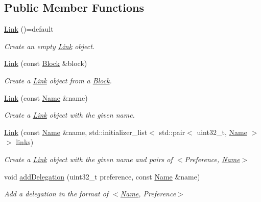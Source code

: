 \subsection*{Public Member Functions}
\begin{DoxyCompactItemize}
\item 
\hyperlink{classndn_1_1Link_a9319fdfdbe6708e6da2694a0db5062b2}{Link} ()=default
\begin{DoxyCompactList}\small\item\em Create an empty \hyperlink{classndn_1_1Link}{Link} object. \end{DoxyCompactList}\item 
\hyperlink{classndn_1_1Link_a0a49619a5844110df36006c2ae773b11}{Link} (const \hyperlink{classndn_1_1Block}{Block} \&block)
\begin{DoxyCompactList}\small\item\em Create a \hyperlink{classndn_1_1Link}{Link} object from a \hyperlink{classndn_1_1Block}{Block}. \end{DoxyCompactList}\item 
\hyperlink{classndn_1_1Link_ab0ed148484feaceef39d6537bd996c5f}{Link} (const \hyperlink{classndn_1_1Name}{Name} \&name)
\begin{DoxyCompactList}\small\item\em Create a \hyperlink{classndn_1_1Link}{Link} object with the given name. \end{DoxyCompactList}\item 
\hyperlink{classndn_1_1Link_a6e535e2f79600c18634b33b9d1d77634}{Link} (const \hyperlink{classndn_1_1Name}{Name} \&name, std\+::initializer\+\_\+list$<$ std\+::pair$<$ uint32\+\_\+t, \hyperlink{classndn_1_1Name}{Name} $>$$>$ links)
\begin{DoxyCompactList}\small\item\em Create a \hyperlink{classndn_1_1Link}{Link} object with the given name and pairs of $<$Preference, \hyperlink{classndn_1_1Name}{Name}$>$ \end{DoxyCompactList}\item 
void \hyperlink{classndn_1_1Link_a007eb82b068c027be0791f4ef5f3690e}{add\+Delegation} (uint32\+\_\+t preference, const \hyperlink{classndn_1_1Name}{Name} \&name)
\begin{DoxyCompactList}\small\item\em Add a delegation in the format of $<$\hyperlink{classndn_1_1Name}{Name}, Preference$>$ \end{DoxyCompactList}\item 
$$
\end{DoxyCompactItemize}
